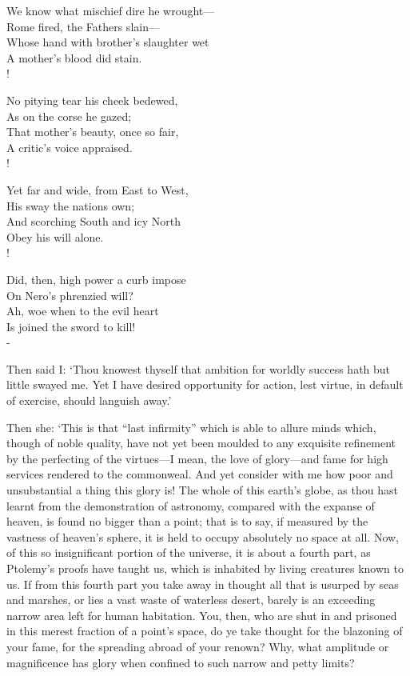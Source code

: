 \documentclass[11pt]{book}
\newenvironment{vpoem}[1]%
  {%
    \centerpoemon{Down their cheeks unfeigned the tear drops}
    \def\poemvsindentlines{#1}\begin{poem}\footnotesize%
  }%
  {%
    \end{poem}\def\poemvsindentlines{\relax}%
    \centerpoemoff
  }
\begin{document}
\begin{vpoem}{24}
    We know what mischief dire he wrought--- \\
      Rome fired, the Fathers slain--- \\
    Whose hand with brother's slaughter wet \\
      A mother's blood did stain. \\!

    No pitying tear his cheek bedewed, \\
      As on the corse he gazed; \\
    That mother's beauty, once so fair, \\
      A critic's voice appraised. \\!

    Yet far and wide, from East to West, \\
      His sway the nations own; \\
    And scorching South and icy North \\
      Obey his will alone. \\!

    Did, then, high power a curb impose \\
      On Nero's phrenzied will? \\
    Ah, woe when to the evil heart \\
      Is joined the sword to kill! \\-
\end{vpoem}


Then said I: `Thou knowest thyself that ambition for worldly success
hath but little swayed me. Yet I have desired opportunity for action,
lest virtue, in default of exercise, should languish away.'

Then she: `This is that ``last infirmity'' which is able to allure minds
which, though of noble quality, have not yet been moulded to any
exquisite refinement by the perfecting of the virtues---I mean, the love
of glory---and fame for high services rendered to the commonweal. And yet
consider with me how poor and unsubstantial a thing this glory is! The
whole of this earth's globe, as thou hast learnt from the demonstration
of astronomy, compared with the expanse of heaven, is found no bigger
than a point; that is to say, if measured by the vastness of heaven's
sphere, it is held to occupy absolutely no space at all. Now, of this so
insignificant portion of the universe, it is about a fourth part, as
Ptolemy's proofs have taught us, which is inhabited by living creatures
known to us. If from this fourth part you take away in thought all that
is usurped by seas and marshes, or lies a vast waste of waterless
desert, barely is an exceeding narrow area left for human habitation.
You, then, who are shut in and prisoned in this merest fraction of a
point's space, do ye take thought for the blazoning of your fame, for
the spreading abroad of your renown? Why, what amplitude or magnificence
has glory when confined to such narrow and petty limits?
\end{document}
